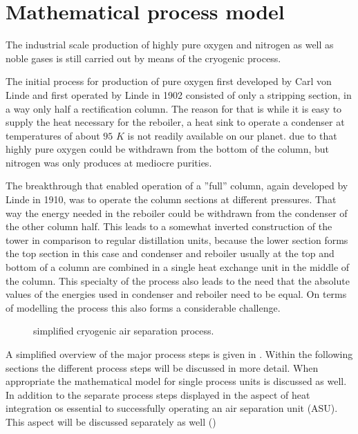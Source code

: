 \chapter{Mathematical process model}
\label{chp:MathModel}

%        

    The industrial scale production of highly pure oxygen and nitrogen as well as noble
    gases is still carried out by means of the cryogenic process.

    The initial process for production of pure oxygen first developed by Carl von Linde
    and first operated by Linde in 1902 \cite{Barron.1985} consisted of only
    a stripping section, in a way only half a rectification column. The reason for that is
    while it is easy to supply the heat necessary for the reboiler, a heat sink to operate
    a condenser at temperatures of about $95$ $K$ is not readily available on our planet.
    due to that highly pure oxygen could be withdrawn from the bottom of the column, but
    nitrogen was only produces at mediocre purities.

    The breakthrough that enabled operation of a ''full'' column, again developed by Linde in 1910,  was to operate the
    column sections at different pressures. That way the energy needed in the reboiler
    could be withdrawn from the condenser of the other column half. This leads to a
    somewhat inverted construction of the tower in comparison to regular distillation
    units, because the lower section forms the top section in this case and condenser
    and reboiler usually at the top and bottom of a column are combined in a single
    heat exchange unit in the middle of the column. This specialty of the process also
    leads to the need that the absolute values of the energies used in condenser and
    reboiler need to be equal. On terms of modelling the process this also forms a
    considerable challenge.

    \begin{figure}
        
        \caption{simplified cryogenic air separation process.}
        \label{fig:asu_simple}
    \end{figure}

    A simplified overview of the major process steps is given in .
    Within the following sections the different process steps will be discussed in more detail.
    When appropriate the mathematical model for single process units is discussed as well.
    In addition to the separate process steps displayed in  the aspect
    of heat integration os essential to successfully operating an air separation unit (ASU).
    This aspect will be discussed separately as well ()

